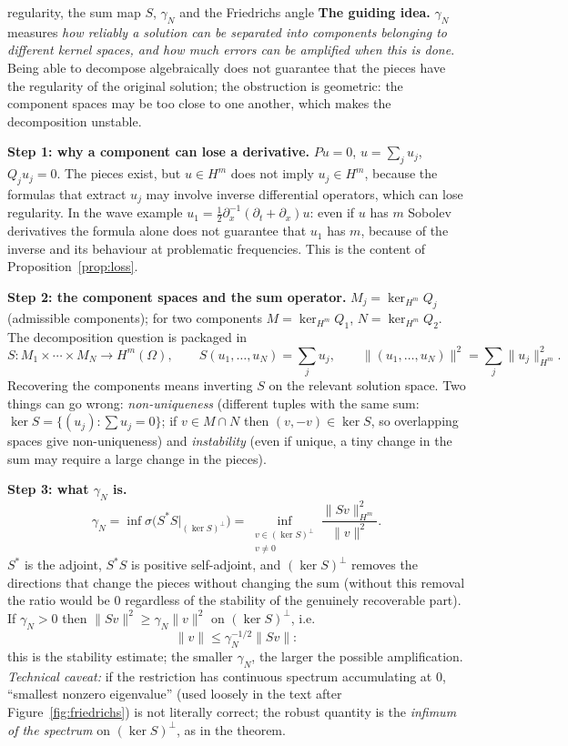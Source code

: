 \begin{explained}{regularity, the sum map $S$, $\gamma_N$ and the Friedrichs angle}
\textbf{The guiding idea.} $\gamma_N$ measures \emph{how reliably a solution can be separated into components belonging to different kernel spaces, and how much errors can be amplified when this is done}. Being able to decompose algebraically does not guarantee that the pieces have the regularity of the original solution; the obstruction is geometric: the component spaces may be too close to one another, which makes the decomposition unstable.

\medskip\textbf{Step 1: why a component can lose a derivative.} $Pu=0$, $u=\sum_ju_j$, $Q_ju_j=0$. The pieces exist, but $u\in H^m$ does not imply $u_j\in H^m$, because the formulas that extract $u_j$ may involve inverse differential operators, which can lose regularity. In the wave example $u_1=\tfrac12\partial_x^{-1}(\partial_t+\partial_x)u$: even if $u$ has $m$ Sobolev derivatives the formula alone does not guarantee that $u_1$ has $m$, because of the inverse and its behaviour at problematic frequencies. This is the content of Proposition~\ref{prop:loss}.

\medskip\textbf{Step 2: the component spaces and the sum operator.} $M_j=\ker_{H^m}Q_j$ (admissible components); for two components $M=\ker_{H^m}Q_1$, $N=\ker_{H^m}Q_2$. The decomposition question is packaged in
\[
S:M_1\times\cdots\times M_N\to H^m(\Omega),\qquad S(u_1,\dots,u_N)=\sum_ju_j,\qquad \|(u_1,\dots,u_N)\|^2=\sum_j\|u_j\|_{H^m}^2 .
\]
Recovering the components means inverting $S$ on the relevant solution space. Two things can go wrong: \emph{non-uniqueness} (different tuples with the same sum: $\ker S=\{(u_j):\sum u_j=0\}$; if $v\in M\cap N$ then $(v,-v)\in\ker S$, so overlapping spaces give non-uniqueness) and \emph{instability} (even if unique, a tiny change in the sum may require a large change in the pieces).

\medskip\textbf{Step 3: what $\gamma_N$ is.}
\[
\gamma_N=\inf\sigma\big(S^*S|_{(\ker S)^\perp}\big)=\inf_{\substack{v\in(\ker S)^\perp\\v\ne0}}\frac{\|Sv\|_{H^m}^2}{\|v\|^2}.
\]
$S^*$ is the adjoint, $S^*S$ is positive self-adjoint, and $(\ker S)^\perp$ removes the directions that change the pieces without changing the sum (without this removal the ratio would be $0$ regardless of the stability of the genuinely recoverable part). If $\gamma_N>0$ then $\|Sv\|^2\ge\gamma_N\|v\|^2$ on $(\ker S)^\perp$, i.e.
\[
\|v\|\le\gamma_N^{-1/2}\|Sv\|:
\]
this is the stability estimate; the smaller $\gamma_N$, the larger the possible amplification. \emph{Technical caveat:} if the restriction has continuous spectrum accumulating at $0$, ``smallest nonzero eigenvalue'' (used loosely in the text after Figure~\ref{fig:friedrichs}) is not literally correct; the robust quantity is the \emph{infimum of the spectrum} on $(\ker S)^\perp$, as in the theorem.


\end{explained}
